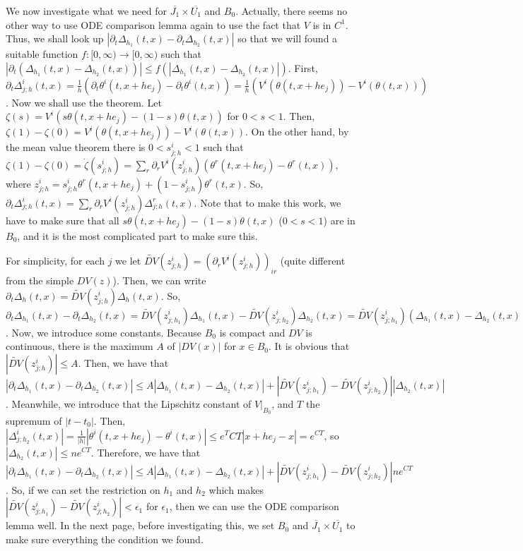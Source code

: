 \documentclass{article}
\begin{document}
We now investigate what we need for $\overline{J_1} \times \overline{U_1}$ and $B_0$.
Actually, there seems no other way to use ODE comparison lemma again to use the fact that $V$ is in $C^1$.
Thus, we shall look up $|\partial_t \Delta_{h_1}(t, x) - \partial_t \Delta_{h_2}(t, x)|$ so that we will found a suitable function $f : [0, \infty) \to [0, \infty)$ such that $|\partial_t (\Delta_{h_1}(t, x) - \Delta_{h_2}(t, x))| \le f(|\Delta_{h_1}(t, x) - \Delta_{h_2}(t, x)|)$.
First, $\partial_t \Delta^i_{j; h}(t, x) = \frac{1}{h} (\partial_t \theta^i(t, x + he_j) - \partial_t \theta^i(t, x)) = \frac{1}{h} (V^i(\theta(t, x + he_j)) - V^i(\theta(t, x)))$.
Now we shall use the theorem.
Let $\zeta(s) = V^i(s\theta(t, x + he_j) - (1 - s)\theta(t, x))$ for $0 < s < 1$.
Then, $\zeta(1) - \zeta(0) = V^i(\theta(t, x + he_j)) - V^i(\theta(t, x))$.
On the other hand, by the mean value theorem there is $0 < s^i_{j; h} < 1$ such that $\zeta(1) - \zeta(0) = \dot{\zeta}(s^i_{j; h}) = \sum_r \partial_r V^i(z^i_{j;h}) (\theta^r(t, x + he_j) - \theta^r(t, x))$, where $z^i_{j;h} = s^i_{j;h} \theta^r(t, x + he_j) + (1 - s^i_{j;h}) \theta^r(t, x)$.
So, $\partial_t \Delta^i_{j;h}(t, x) = \sum_r \partial_r V^i(z^i_{j;h}) \Delta^r_{j;h}(t, x)$.
Note that to make this work, we have to make sure that all $s\theta(t, x + he_j) - (1 - s)\theta(t, x)$ ($0 < s < 1$) are in $B_0$, and it is the most complicated part to make sure this.

For simplicity, for each $j$ we let $\tilde{DV}(z^i_{j;h}) = (\partial_r V^i(z^i_{j;h}))_{ir}$ (quite different from the simple $DV(z)$).
Then, we can write $\partial_t \Delta_{h}(t, x) = \tilde{DV}(z^i_{j;h}) \Delta_{h}(t, x)$.
So, $\partial_t \Delta_{h_1}(t, x) - \partial_t \Delta_{h_2}(t, x) = \tilde{DV}(z^i_{j;h_1}) \Delta_{h_1}(t, x) - \tilde{DV}(z^i_{j;h_2}) \Delta_{h_2}(t, x) = \tilde{DV}(z^i_{j;h_1}) (\Delta_{h_1}(t, x) - \Delta_{h_2}(t, x)) + (\tilde{DV}(z^i_{j;h_1}) - \tilde{DV}(z^i_{j;h_2})) \Delta_{h_2}(t, x)$.
Now, we introduce some constants.
Because $B_0$ is compact and $DV$ is continuous, there is the maximum $A$ of $|DV(x)|$ for $x \in B_0$.
It is obvious that $|\tilde{DV}(z^i_{j;h})| \le A$.
Then, we have that $|\partial_t \Delta_{h_1}(t, x) - \partial_t \Delta_{h_2}(t, x)| \le A |\Delta_{h_1}(t, x) - \Delta_{h_2}(t, x)| + |\tilde{DV}(z^i_{j;h_1}) - \tilde{DV}(z^i_{j;h_2})| |\Delta_{h_2}(t, x)|$.
Meanwhile, we introduce that the Lipschitz constant of $V|_{B_0}$, and $T$ the supremum of $|t - t_0|$.
Then, $|\Delta^i_{j;h_2}(t, x)| = \frac{1}{|h|} |\theta^i(t, x + he_j) - \theta^i(t, x)| \le e^T{CT} |x + he_j - x| = e^{CT}$, so $|\Delta_{h_2}(t, x)| \le ne^{CT}$.
Therefore, we have that $|\partial_t \Delta_{h_1}(t, x) - \partial_t \Delta_{h_2}(t, x)| \le A |\Delta_{h_1}(t, x) - \Delta_{h_2}(t, x)| + |\tilde{DV}(z^i_{j;h_1}) - \tilde{DV}(z^i_{j;h_2})| ne^{CT}$.
So, if we can set the restriction on $h_1$ and $h_2$ which makes $|\tilde{DV}(z^i_{j;h_1}) - \tilde{DV}(z^i_{j;h_2})| < \epsilon_1$ for $\epsilon_1$, then we can use the ODE comparison lemma well.
In the next page, before investigating this, we set $B_0$ and $\overline{J_1} \times \overline{U_1}$ to make sure everything the condition we found.
\end{document}
